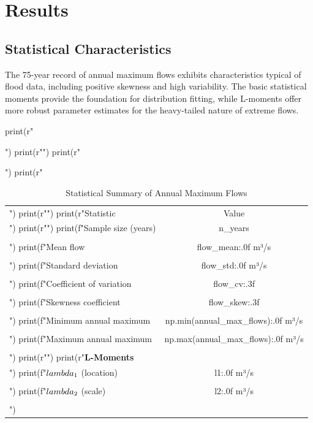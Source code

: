 \documentclass[a4paper, 11pt]{article}
\begin{document}
\section{Results}

\subsection{Statistical Characteristics}

The 75-year record of annual maximum flows exhibits characteristics typical of flood data,
including positive skewness and high variability. The basic statistical moments provide the
foundation for distribution fitting, while L-moments offer more robust parameter estimates
for the heavy-tailed nature of extreme flows.

\begin{pycode}
print(r"\begin{table}[htbp]")
print(r"\centering")
print(r"\caption{Statistical Summary of Annual Maximum Flows}")
print(r"\begin{tabular}{lc}")
print(r"\toprule")
print(r"Statistic & Value \\")
print(r"\midrule")
print(f"Sample size (years) & {n_years} \\\\")
print(f"Mean flow & {flow_mean:.0f} m³/s \\\\")
print(f"Standard deviation & {flow_std:.0f} m³/s \\\\")
print(f"Coefficient of variation & {flow_cv:.3f} \\\\")
print(f"Skewness coefficient & {flow_skew:.3f} \\\\")
print(f"Minimum annual maximum & {np.min(annual_max_flows):.0f} m³/s \\\\")
print(f"Maximum annual maximum & {np.max(annual_max_flows):.0f} m³/s \\\\")
print(r"\midrule")
print(r"\textbf{L-Moments} & \\")
print(f"$\\lambda_1$ (location) & {l1:.0f} m³/s \\\\")
print(f"$\\lambda_2$ (scale) & {l2:.0f} m³/s \\\\")

\end{tabular}
\end{table}
\end{pycode}
\end{document}
